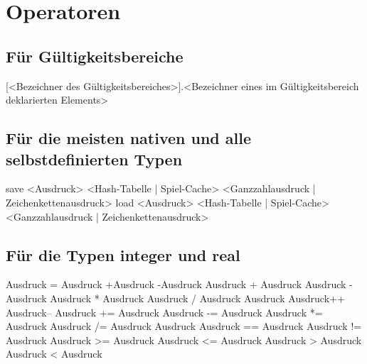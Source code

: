 \chapter{Operatoren}

\section{Für Gültigkeitsbereiche}
[<Bezeichner des Gültigkeitsbereiches>].<Bezeichner eines im Gültigkeitsbereich deklarierten Elements>

\section{Für die meisten nativen und alle selbstdefinierten Typen}
save <Ausdruck> <Hash-Tabelle | Spiel-Cache> <Ganzzahlausdruck | Zeichenkettenausdruck>
load <Ausdruck> <Hash-Tabelle | Spiel-Cache> <Ganzzahlausdruck | Zeichenkettenausdruck>

\section{Für die Typen integer und real}
Ausdruck = Ausdruck
+Ausdruck
-Ausdruck
Ausdruck + Ausdruck
Ausdruck - Ausdruck
Ausdruck * Ausdruck
Ausdruck / Ausdruck
Ausdruck %
Ausdruck++
Ausdruck--
Ausdruck += Ausdruck
Ausdruck -= Ausdruck
Ausdruck *= Ausdruck
Ausdruck /= Ausdruck
Ausdruck %
Ausdruck == Ausdruck
Ausdruck != Ausdruck
Ausdruck >= Ausdruck
Ausdruck <= Ausdruck
Ausdruck > Ausdruck
Ausdruck < Ausdruck


